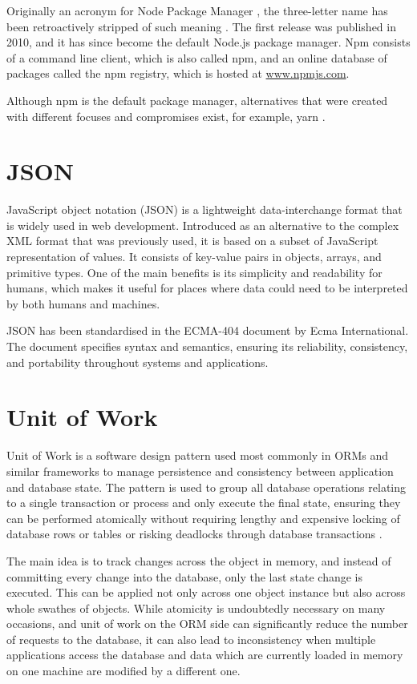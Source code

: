 Originally an acronym for Node Package Manager \cite{npm-old-readme}, the
three-letter name has been retroactively stripped of such meaning
\cite{npm-usage}. The first release was published in 2010, and it has since
become the default Node.js package manager. Npm consists of a command line
client, which is also called npm, and an online database of packages called the
npm registry, which is hosted at \url{www.npmjs.com}. 

Although npm is the default package manager, alternatives that were created with
different focuses and compromises exist, for example, yarn \cite{Yarn}.

\section*{JSON}
JavaScript object notation (JSON) is a lightweight data-interchange format that
is widely used in web development. Introduced as an alternative to the complex
XML format that was previously used, it is based on a subset of JavaScript
representation of values. It consists of key-value pairs in objects, arrays, and
primitive types. One of the main benefits is its simplicity and readability for
humans, which makes it useful for places where data could need to be interpreted
by both humans and machines.

JSON has been standardised in the ECMA-404 \cite{ECMA-404} document by Ecma
International. The document specifies syntax and semantics, ensuring its
reliability, consistency, and portability throughout systems and applications.

\section*{Unit of Work}
Unit of Work is a software design pattern used most commonly in ORMs and similar
frameworks to manage persistence and consistency between application and
database state. The pattern is used to group all database operations relating to
a single transaction or process and only execute the final state, ensuring they
can be performed atomically without requiring lengthy and expensive locking of
database rows or tables or risking deadlocks through database transactions
\cite[p.~184]{fowler-patterns-2003}.

The main idea is to track changes across the object in memory, and instead of
committing every change into the database, only the last state change is
executed. This can be applied not only across one object instance but also
across whole swathes of objects. While atomicity is undoubtedly necessary on
many occasions, and unit of work on the ORM side can significantly reduce the
number of requests to the database, it can also lead to inconsistency when
multiple applications access the database and data which are currently loaded in
memory on one machine are modified by a different one.


